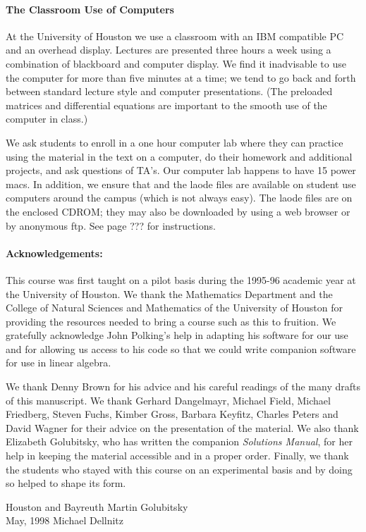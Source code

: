 \paragraph{The Classroom Use of Computers}  At the University of Houston we
use a classroom with an IBM compatible PC and an overhead display.  Lectures 
are presented three hours a week using a combination of blackboard and 
computer display.  We find it inadvisable to use the computer for more than 
five minutes at a time; we tend to go back and forth between standard lecture 
style and computer presentations.  (The preloaded matrices and differential 
equations are important to the smooth use of the computer in class.)  

We ask students to enroll in a one hour computer lab where they can practice 
using the material in the text on a computer, do their homework and additional
projects, and ask questions of TA's.  Our computer lab happens to have 15 
power macs.  In addition, we ensure that \Matlab and the {\sf laode} files are
available on student use computers around the campus (which is not always 
easy).  The {\sf laode} files are on the enclosed CDROM; they may also be 
downloaded by using a web browser or by anonymous ftp.  See page ??? for 
instructions.

\paragraph{Acknowledgements:}  This course was first taught on a pilot basis 
during the 1995-96 academic year at the University of Houston.  We thank the 
Mathematics Department and the College of Natural Sciences and Mathematics of 
the University of Houston for providing the resources needed to bring a 
course such as this to fruition.  We gratefully acknowledge John Polking's 
help in adapting his software for our use and for allowing us access to his 
code so that we could write companion software for use in linear algebra.

We thank Denny Brown for his advice and his careful readings of the many 
drafts of this manuscript.  We thank Gerhard Dangelmayr, Michael Field, 
Michael Friedberg, Steven Fuchs, Kimber Gross, Barbara Keyfitz, Charles 
Peters and David Wagner for their advice on the presentation of the material. 
We also thank Elizabeth Golubitsky, who has written the companion 
{\em Solutions Manual\/}, for her help in keeping the material accessible and 
in a proper order.  Finally, we thank the students who stayed with this 
course on an experimental basis and by doing so helped to shape its form.

\vspace{0.1in}

\noindent Houston and Bayreuth \hfill Martin Golubitsky \\
May, 1998  \hfill Michael Dellnitz

